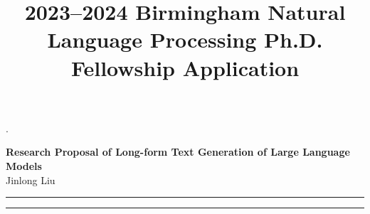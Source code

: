 \documentclass[10pt]{article}
\author{}
\title{2023--2024 Birmingham Natural Language Processing Ph.D. Fellowship Application}
\begin{document}
\renewcommand{\thesection}{\Roman{section}}.
	
	\begin{center}
		{\Large \textbf{Research Proposal of Long-form Text Generation of Large Language Models}}\\
		\vspace{1em}
		{\large Jinlong Liu}\\
		\vspace{1em}
	\end{center}

	\begin{center}
		\rule{150mm}{0.2mm}
	\end{center}	
	
	\begin{abstract}
	
		
	\end{abstract}

	\begin{center}
		\rule{150mm}{0.2mm}
	\end{center}	

	\vspace{5mm}
\end{document}
